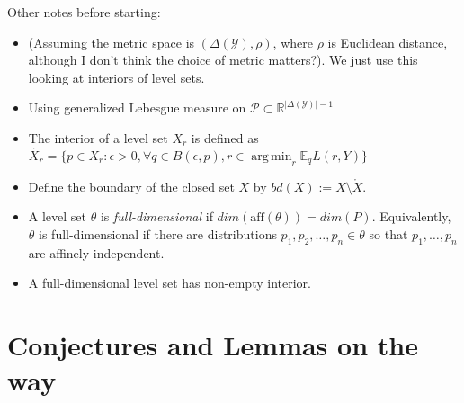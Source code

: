 \documentclass[12pt]{article}
\newcommand{\reals}{\mathbb{R}}
\newcommand{\E}{\mathbb{E}}
\renewcommand{\P}{\mathcal{P}}
\newcommand{\Y}{\mathcal{Y}}
\newcommand{\inter}[1]{\mathring{#1}}%
\newcommand{\aff}{\text{aff}}
\DeclareMathOperator*{\argmin}{arg\,min}
\begin{document}
Other notes before starting:
\begin{itemize}
\item (Assuming the metric space is $(\Delta(\Y), \rho)$, where $\rho$ is Euclidean distance, although I don't think the choice of metric matters?).
We just use this looking at interiors of level sets.
\item Using generalized Lebesgue measure on $\P \subset \reals^{|\Delta(\Y)|-1}$
\item The interior of a level set $X_r$ is defined as $\inter{X_r} = \{p \in X_r: \epsilon > 0,  \forall q \in B(\epsilon,p), r \in \argmin_r \E_q L(r,Y)\}$
\item Define the boundary of the closed set $X$ by $bd(X) := X \setminus \inter{X}$.
\item A level set $\theta$ is \emph{full-dimensional} if $dim(\aff(\theta)) = dim(P)$. 
Equivalently, $\theta$ is full-dimensional if there are distributions $p_1, p_2, \ldots, p_n \in \theta$ so that $p_1, \ldots, p_n$ are affinely independent.
\item A full-dimensional level set has non-empty interior.
\end{itemize}

\section{Conjectures and Lemmas on the way}
\end{document}
